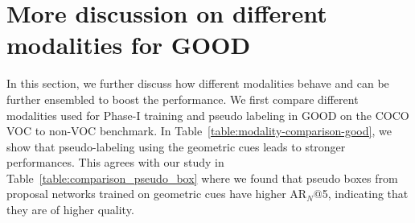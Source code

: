 \documentclass{article} \usepackage{iclr2023_conference,times}
\begin{document}
\begin{table}
\centering
{}
    \caption{\textbf{Architecture choice.} FCOS is a single-stage proposal-free object detector, and OLN is a two-stage proposal-based object detector (modified from Faster R-CNN). GOOD can significantly improve the open-world performance of both architectures.}\label{table:fcos}
\end{table}




\section{More discussion on different modalities for GOOD}\label{appdex:modalities}

In this section, we further discuss how different modalities behave and can be further ensembled to boost the performance. 
We first compare different modalities used for Phase-I training and pseudo labeling in GOOD on the COCO VOC to non-VOC benchmark. 
In Table~\ref{table:modality-comparison-good}, we show that pseudo-labeling using the geometric cues leads to stronger performances. This agrees with our study in Table~\ref{table:comparison_pseudo_box} where we found that pseudo boxes from proposal networks trained on geometric cues have higher AR$_N$@5, indicating that they are of higher quality.
\end{document}
